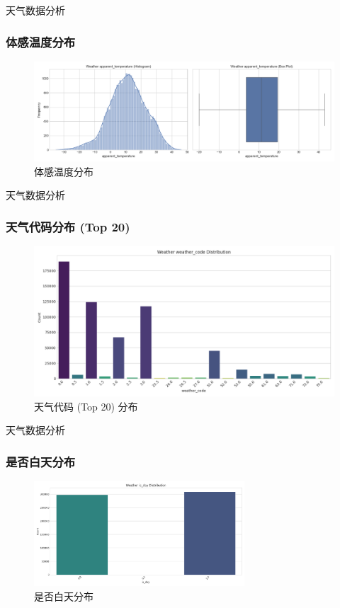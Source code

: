 \documentclass{beamer} %
\begin{document}
\begin{frame}{天气数据分析}
    \frametitle{体感温度分布}
    \begin{figure}
        \centering
        \includegraphics[width=\textwidth]{../plots/weather_distribution_apparent_temperature.png}
        \caption{体感温度分布}
    \end{figure}
\end{frame}

\begin{frame}{天气数据分析}
    \frametitle{天气代码分布 (Top 20)}
    \begin{figure}
        \centering
        \includegraphics[width=\textwidth]{../plots/weather_distribution_weather_code.png}
        \caption{天气代码 (Top 20) 分布}
    \end{figure}
\end{frame}

\begin{frame}{天气数据分析}
    \frametitle{是否白天分布}
    \begin{figure}
        \centering
        \includegraphics[width=0.7\textwidth]{../plots/weather_distribution_is_day.png}
        \caption{是否白天分布}
    \end{figure}
\end{frame}
\end{document}
